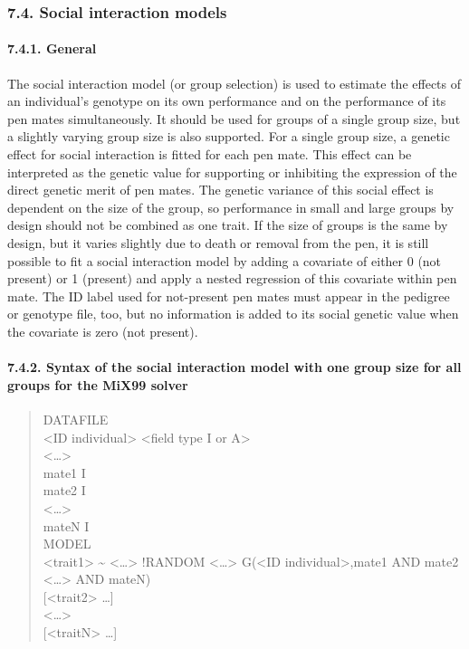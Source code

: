 \subsubsection{7.4. Social interaction models}\label{Stat14}

\paragraph{7.4.1. General}\label{Stat15}

The social interaction model (or group selection) is used to estimate
the effects of an individual's genotype on its own performance and on
the performance of its pen mates simultaneously. It should be used for
groups of a single group size, but a slightly varying group size is also
supported. For a single group size, a genetic effect for social
interaction is fitted for each pen mate. This effect can be interpreted
as the genetic value for supporting or inhibiting the expression of the
direct genetic merit of pen mates. The genetic variance of this social
effect is dependent on the size of the group, so performance in small
and large groups by design should not be combined as one trait. If the
size of groups is the same by design, but it varies slightly due to
death or removal from the pen, it is still possible to fit a social
interaction model by adding a covariate of either 0 (not present) or 1
(present) and apply a nested regression of this covariate within pen
mate. The ID label used for not-present pen mates must appear in the
pedigree or genotype file, too, but no information is added to its
social genetic value when the covariate is zero (not present).

\paragraph{7.4.2. Syntax of the social interaction model with one group
size for all groups for the MiX99 solver}\label{Stat16}

\begin{quote}
DATAFILE\\
\textless ID individual\textgreater{} \textless field type I or
A\textgreater{}\\
\textless\ldots\textgreater{}\\
mate1 I\\
mate2 I\\
\textless\ldots\textgreater{}\\
mateN I\\
MODEL\\
\textless trait1\textgreater{} \textasciitilde{}
\textless\ldots\textgreater{} !RANDOM \textless\ldots\textgreater{}
G(\textless ID individual\textgreater,mate1 AND mate2
\textless\ldots\textgreater{} AND mateN)\\
{[}\textless trait2\textgreater{} \ldots{]}\\
\textless\ldots\textgreater{}\\
{[}\textless traitN\textgreater{} \ldots{]}
\end{quote}

